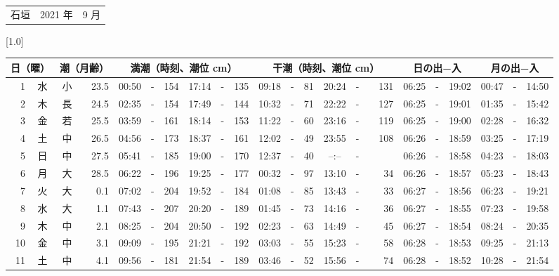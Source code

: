 \documentclass[12pt,a4j]{jsarticle}
\begin{document}
 \begin{table}[htbp]
 \begin{center}
 \begin{tabular}{lcc}
 \LARGE{石垣}  & \large{2021 年} & \large{ 9 月} \\
 \end{tabular}
 \end{center}
 \begin{center}
    \scalebox{0.7}[1.0]{
    \begin{tabular}{|rc|cr|ccrccr|ccrccr|ccc|ccc|}
    \hline
    \multicolumn{2}{|c|}{日（曜）} & \multicolumn{2}{c|}{潮（月齢）} & \multicolumn{6}{c|}{満潮（時刻、潮位 cm）} & \multicolumn{6}{c|}{干潮（時刻、潮位 cm）} & \multicolumn{3}{c|}{日の出−入} &  \multicolumn{3}{c|}{月の出−入}\\
 \hline
 1 & 水 & 小 & 23.5 &  00:50 &-& 154 &  17:14 &-& 135 &  09:18 &-&  81 &  20:24 &-& 131 & 06:25 & -& 19:02 & 00:47 & -& 14:50 \\
 2 & 木 & 長 & 24.5 &  02:35 &-& 154 &  17:49 &-& 144 &  10:32 &-&  71 &  22:22 &-& 127 & 06:25 & -& 19:01 & 01:35 & -& 15:42 \\
 3 & 金 & 若 & 25.5 &  03:59 &-& 161 &  18:14 &-& 153 &  11:22 &-&  60 &  23:16 &-& 119 & 06:25 & -& 19:00 & 02:28 & -& 16:32 \\
 4 & 土 & 中 & 26.5 &  04:56 &-& 173 &  18:37 &-& 161 &  12:02 &-&  49 &  23:55 &-& 108 & 06:26 & -& 18:59 & 03:25 & -& 17:19 \\
 5 & 日 & 中 & 27.5 &  05:41 &-& 185 &  19:00 &-& 170 &  12:37 &-&  40 &  --:-- &-&~~~~~ & 06:26 & -& 18:58 & 04:23 & -& 18:03 \\
 6 & 月 & 大 & 28.5 &  06:22 &-& 196 &  19:25 &-& 177 &  00:32 &-&  97 &  13:10 &-&  34 & 06:26 & -& 18:57 & 05:23 & -& 18:43 \\
 7 & 火 & 大 &  0.1 &  07:02 &-& 204 &  19:52 &-& 184 &  01:08 &-&  85 &  13:43 &-&  33 & 06:27 & -& 18:56 & 06:23 & -& 19:21 \\
 8 & 水 & 大 &  1.1 &  07:43 &-& 207 &  20:20 &-& 189 &  01:45 &-&  73 &  14:16 &-&  36 & 06:27 & -& 18:55 & 07:23 & -& 19:58 \\
 9 & 木 & 中 &  2.1 &  08:25 &-& 204 &  20:50 &-& 192 &  02:23 &-&  63 &  14:49 &-&  45 & 06:27 & -& 18:54 & 08:24 & -& 20:35 \\
10 & 金 & 中 &  3.1 &  09:09 &-& 195 &  21:21 &-& 192 &  03:03 &-&  55 &  15:23 &-&  58 & 06:28 & -& 18:53 & 09:25 & -& 21:13 \\
11 & 土 & 中 &  4.1 &  09:56 &-& 181 &  21:54 &-& 189 &  03:46 &-&  52 &  15:56 &-&  74 & 06:28 & -& 18:52 & 10:28 & -& 21:54 \\

\end{tabular}}
\end{center}
\end{table}
\end{document}

